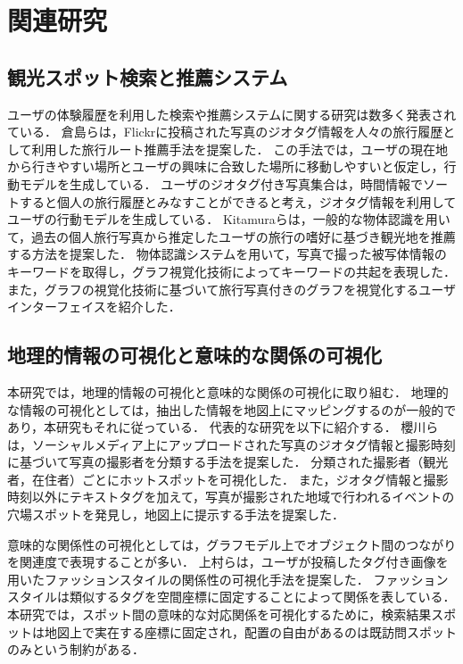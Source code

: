 \documentclass{deimj}
\begin{document}
\section{関連研究}
\label{sec:関連研究}
\subsection{観光スポット検索と推薦システム}
ユーザの体験履歴を利用した検索や推薦システムに関する研究は数多く発表されている．
倉島ら\cite{Kurashima}は，Flickrに投稿された写真のジオタグ情報を人々の旅行履歴として利用した旅行ルート推薦手法を提案した．
この手法では，ユーザの現在地から行きやすい場所とユーザの興味に合致した場所に移動しやすいと仮定し，行動モデルを生成している．
ユーザのジオタグ付き写真集合は，時間情報でソートすると個人の旅行履歴とみなすことができると考え，ジオタグ情報を利用してユーザの行動モデルを生成している．
Kitamuraら\cite{Kitamura}は，一般的な物体認識を用いて，過去の個人旅行写真から推定したユーザの旅行の嗜好に基づき観光地を推薦する方法を提案した．
物体認識システムを用いて，写真で撮った被写体情報のキーワードを取得し，グラフ視覚化技術によってキーワードの共起を表現した．
また，グラフの視覚化技術に基づいて旅行写真付きのグラフを視覚化するユーザインターフェイスを紹介した．
\subsection{地理的情報の可視化と意味的な関係の可視化}
本研究では，地理的情報の可視化と意味的な関係の可視化に取り組む．
地理的な情報の可視化としては，抽出した情報を地図上にマッピングするのが一般的であり，本研究もそれに従っている．
代表的な研究を以下に紹介する．
櫻川ら\cite{櫻川2015}は，ソーシャルメディア上にアップロードされた写真のジオタグ情報と撮影時刻に基づいて写真の撮影者を分類する手法を提案した．
分類された撮影者（観光者，在住者）ごとにホットスポットを可視化した．
また，ジオタグ情報と撮影時刻以外にテキストタグを加えて，写真が撮影された地域で行われるイベントの穴場スポットを発見し，地図上に提示する手法を提案した\cite{櫻川2016}．

意味的な関係性の可視化としては，グラフモデル上でオブジェクト間のつながりを関連度で表現することが多い．
上村ら\cite{上村}は，ユーザが投稿したタグ付き画像を用いたファッションスタイルの関係性の可視化手法を提案した．
ファッションスタイルは類似するタグを空間座標に固定することによって関係を表している．
本研究では，スポット間の意味的な対応関係を可視化するために，検索結果スポットは地図上で実在する座標に固定され，配置の自由があるのは既訪問スポットのみという制約がある．
\end{document}
